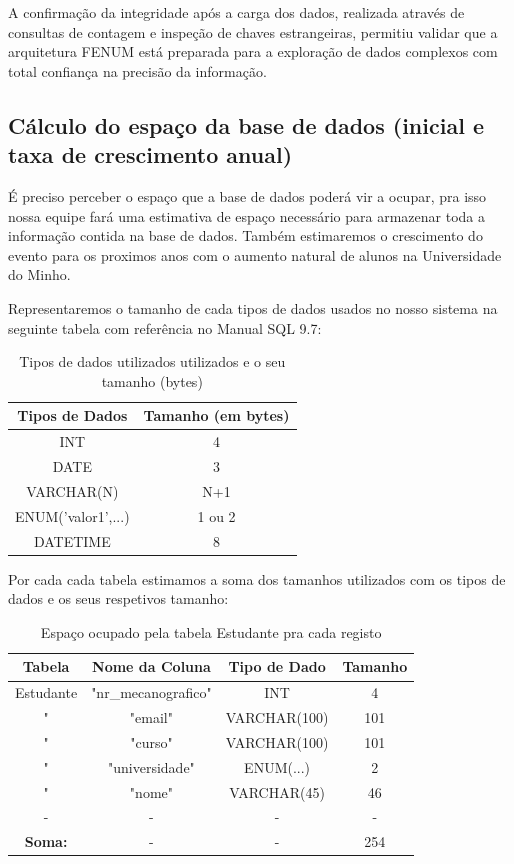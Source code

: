 \documentclass[12pt,a4paper]{article}
\renewcommand{\arraystretch}{1.5}  %
\begin{document}
A confirmação da integridade após a carga dos dados, realizada através de consultas de contagem e inspeção de chaves estrangeiras, permitiu validar que a arquitetura FENUM está preparada para a exploração de dados complexos com total confiança na precisão da informação.

\subsection{Cálculo do espaço da base de dados (inicial e taxa de crescimento anual)}

É preciso perceber o espaço que a base de dados poderá vir a ocupar, pra isso nossa equipe
fará uma estimativa de espaço necessário para armazenar toda a informação contida 
na base de dados. Também estimaremos o crescimento do evento para os proximos anos com o aumento
natural de alunos na Universidade do Minho. 

Representaremos o tamanho de cada tipos de dados usados no nosso sistema na seguinte tabela
com referência no Manual SQL 9.7:

\begin{table}[H]

\centering
\renewcommand{\arraystretch}{1.2}
\begin{tabular}{|c|c|}
\hline
\textbf{Tipos de Dados} & \textbf{Tamanho (em bytes)}  \\ \hline

INT & 4  \\ \hline
DATE & 3  \\ \hline
VARCHAR(N) & N+1  \\ \hline
ENUM('valor1',...) & 1 ou 2 \\ \hline
DATETIME & 8 \\ \hline
\end{tabular}
\caption{Tipos de dados utilizados utilizados e o seu tamanho (bytes)}
\end{table}

Por cada cada tabela estimamos a soma dos tamanhos utilizados com os tipos de dados e os 
seus respetivos tamanho:

\begin{table}[H]
\centering
\renewcommand{\arraystretch}{1.2}
\begin{tabular}{|c|c|c|c|}
\hline
\textbf{Tabela} & \textbf{Nome da Coluna} & \textbf{Tipo de Dado} & \textbf{Tamanho} \\ \hline
Estudante & "nr\_mecanografico" & INT & 4 \\ \hline
"& "email" & VARCHAR(100) & 101 \\ \hline
"& "curso" & VARCHAR(100) & 101 \\ \hline
"& "universidade" & ENUM(...) & 2 \\ \hline
"& "nome" & VARCHAR(45) & 46 \\ \hline
- & - & - & - \\ \hline
\textbf{Soma:} & - & - & 254 \\ \hline 
\end{tabular}

\caption{Espaço ocupado pela tabela Estudante pra cada registo}
\end{table}
\end{document}
